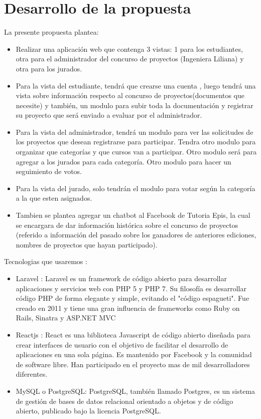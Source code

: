 \documentclass[%
 reprint,
 amsmath,amssymb,
 aps,
]{revtex4-1}
\begin{document}
\section {Desarrollo de la propuesta}
La presente propuesta plantea:
\begin{itemize}
    \item Realizar una aplicación web que contenga 3 vistas: 1 para los estudiantes, otra para el administrador del concurso de proyectos (Ingeniera Liliana) y otra para los jurados.
     \item Para la vista del estudiante, tendrá que crearse una cuenta , luego tendrá una vista sobre información respecto al concurso de proyectos(documentos que necesite) y también, un modulo para subir toda la documentación y registrar su proyecto que será enviado a evaluar por el administrador.
     \item Para la vista del administrador, tendrá un modulo para ver las solicitudes de los proyectos que desean registrarse para participar. Tendra otro modulo para organizar que categorías y que cursos van a participar. Otro modulo será para agregar a los jurados para cada categoría. Otro modulo para hacer un seguimiento de votos. 
    \item Para la vista del jurado, solo tendrán el modulo para votar según la categoría a la que esten asignados.
    \item Tambien se plantea agregar un chatbot al Facebook de Tutoria Epis, la cual se encargara de dar información histórica sobre el concurso de proyectos (referido a información del pasado sobre los ganadores de anteriores ediciones, nombres de proyectos que hayan participado).
\end{itemize}
\newpage
Tecnologias que usaremos :
\begin{itemize}
\item Laravel :
Laravel es un framework de código abierto para desarrollar aplicaciones y servicios web con PHP 5 y PHP 7. Su filosofía es desarrollar código PHP de forma elegante y simple, evitando el "código espagueti". Fue creado en 2011 y tiene una gran influencia de frameworks como Ruby on Rails, Sinatra y ASP.NET MVC
\item Reactjs :
React es una biblioteca Javascript de código abierto diseñada para crear interfaces de usuario con el objetivo de facilitar el desarrollo de aplicaciones en una sola página. Es mantenido por Facebook y la comunidad de software libre. Han participado en el proyecto mas de mil desarrolladores diferentes.
\item MySQL o PostgreSQL:
PostgreSQL, también llamado Postgres, es un sistema de gestión de bases de datos relacional orientado a objetos y de código abierto, publicado bajo la licencia PostgreSQL.
\end{itemize}
\end{document}
